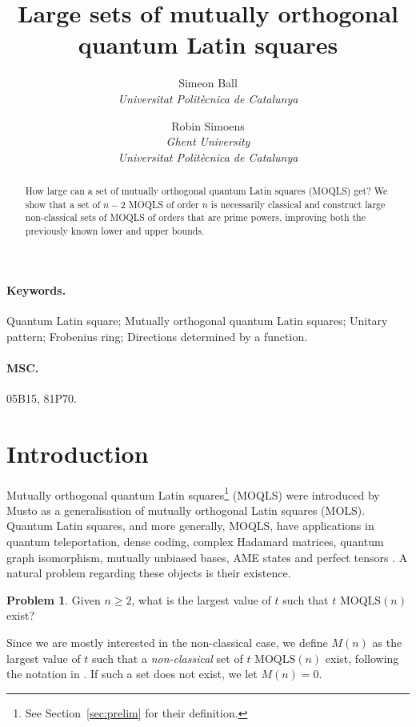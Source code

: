 \documentclass[a4paper]{article}
\title{Large sets of mutually orthogonal quantum Latin squares}
\author{Simeon Ball \\ \textit{Universitat Politècnica de Catalunya} \and Robin Simoens \\ \textit{Ghent University} \\ \textit{Universitat Politècnica de Catalunya}}
\date{}
\theoremstyle{definition}
\newtheorem{problem}[theorem]{Problem}
\newcommand{\MOQLS}[1]{\(\mathrm{MOQLS}(#1)\)}
\begin{document}
\maketitle

\begin{abstract}
    How large can a set of mutually orthogonal quantum Latin squares (MOQLS) get? We show that a set of \(n-2\) MOQLS of order \(n\) is necessarily classical and construct large non-classical sets of MOQLS of orders that are prime powers, improving both the previously known lower and upper bounds.
\end{abstract}

\paragraph{Keywords.} Quantum Latin square; Mutually orthogonal quantum Latin squares; Unitary pattern; Frobenius ring; Directions determined by a function.

\paragraph{MSC.}
05B15, %
81P70. %

\section{Introduction}

Mutually orthogonal quantum Latin squares\footnote{See Section~\ref{sec:prelim} for their definition.} (MOQLS) were introduced by Musto \cite{Mustothesis} as a generalisation of mutually orthogonal Latin squares (MOLS). Quantum Latin squares, and more generally, MOQLS, have applications in quantum teleportation, dense coding, complex Hadamard matrices, quantum graph isomorphism, mutually unbiased bases, AME states and perfect tensors \cite{Qgraphisomorphism,nonclassical,motivation,2MOQLS7,Mustopaper,Mustothesis,GMOQLS}. %
A natural problem regarding these objects is their existence.

\begin{problem}
    Given \(n\geq2\), what is the largest value of \(t\) such that \(t\) \MOQLS{n} exist?
\end{problem}

Since we are mostly interested in the non-classical case, we define \(M(n)\) as the largest value of \(t\) such that a \emph{non-classical} set of \(t\) \MOQLS{n} exist, following the notation in \cite{GMOQLS}. If such a set does not exist, we let \(M(n)=0\).
\end{document}

